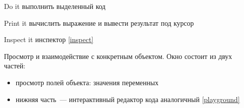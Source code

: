 
\begin{description}
    \item{Do it}  выполнить выделенный код
    \item{Print it}  вычислить выражение и вывести результат под курсор
    \item{Inspect it}  инспектор \ref{inspect}
\end{description}

\label{inspect}


Просмотр и взаимодействие с конкретным объектом. Окно состоит из двух частей:
\begin{itemize}
    \item просмотр полей объекта: значения переменных
    \item нижняя часть\ --- интерактивный редактор кода аналогичный \ref{playground}
\end{itemize}




\secup
